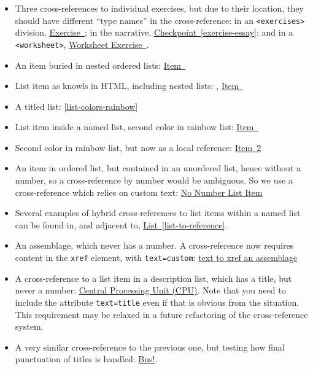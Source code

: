 \documentclass{sn-jnl}
\theoremstyle{thmstyleone}%
\theoremstyle{thmstyletwo}%
\theoremstyle{thmstylethree}%
\newcommand{\xreffont}{\relax}
\newcommand{\mono}[1]{\texttt{#1}}
\numberwithin{equation}{section}
\begin{document}
\begin{itemize}[label=\textbullet]
\item{} Three cross-references to individual exercises, but due to their location, they should have different ``type names'' in the cross-reference: in an \mono{<exercises>} division, \hyperlink{duplicate-divisional}{Exercise~{\xreffont 2}}; in the narrative, \hyperref[exercise-essay]{Checkpoint~{\xreffont\ref{exercise-essay}}}; and in a \mono{<worksheet>}, \hyperlink{exercise-vector-addition}{Worksheet Exercise~{\xreffont 1}}.%
\item{}An item buried in nested ordered lists: \hyperlink{list-two-two-two-three}{Item~{\xreffont 3}}%
\item{}List item as knowls in HTML, including nested lists: \hyperlink{list-two}{{\xreffont 2}}, \hyperlink{list-two-two-two}{Item~{\xreffont 2}}%
\item{}A titled list: \hyperref[list-colors-rainbow]{{\xreffont\ref{list-colors-rainbow}}}%
\item{}List item inside a named list, second color in rainbow list: \hyperlink{rainbow-orange}{Item~{\xreffont 2}}%
\item{}Second color in rainbow list, but now as a local reference: \hyperlink{rainbow-orange}{Item~2}%
\item{}An item in ordered list, but contained in an unordered list, hence without a number, so a cross-reference by number would be ambiguous.  So we use a cross-reference which relies on custom text: \hyperlink{target-no-number}{No Number List Item}%
\item{}Several examples of hybrid cross-references to list items within a named list can be found in, and adjacent to, \hyperref[list-to-reference]{List~{\xreffont\ref{list-to-reference}}}.%
\item{}An assemblage, which never has a number.  A cross-reference now requires content in the \mono{xref} element, with \mono{text=\textquotesingle{}custom\textquotesingle{}}: \hyperref[assemblage-basics]{text to xref an assemblage}%
\item{}A cross-reference to a list item in a description list, which has a title, but never a number: \hyperlink{cpu-definition}{Central Processing Unit (CPU)}.  Note that you need to include the attribute \mono{text=\textquotedbl{}title\textquotedbl{}} even if that is obvious from the situation.  This requirement may be relaxed in a future refactoring of the cross-reference system.%
\item{}A very similar cross-reference to the previous one, but testing how final punctuation of titles is handled: \hyperlink{bus-definition}{Bus!}.%

\end{itemize}
\end{document}
